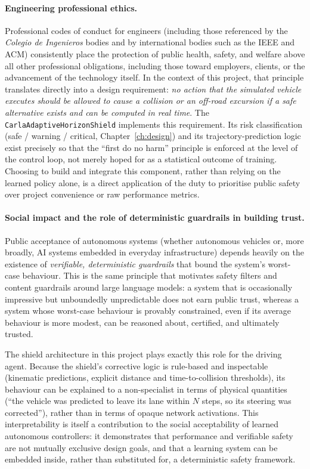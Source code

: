 \paragraph{Engineering professional ethics.}
Professional codes of conduct for engineers (including those referenced by the
\textit{Colegio de Ingenieros} bodies and by international bodies such as the IEEE and
ACM) consistently place the protection of public health, safety, and welfare above
all other professional obligations, including those toward employers, clients, or the
advancement of the technology itself. In the context of this project, that principle
translates directly into a design requirement: \textit{no action that the simulated
vehicle executes should be allowed to cause a collision or an off-road excursion if a
safe alternative exists and can be computed in real time}. The
\texttt{CarlaAdaptiveHorizonShield} implements this requirement. Its risk
classification (safe / warning / critical, Chapter~\ref{ch:design}) and its
trajectory-prediction logic exist precisely so that the ``first do no harm'' principle is
enforced at the level of the control loop, not merely hoped for as a statistical outcome
of training. Choosing to build and integrate this component, rather than relying on the
learned policy alone, is a direct application of the duty to prioritise public safety
over project convenience or raw performance metrics.

\paragraph{Social impact and the role of deterministic guardrails in building trust.}
Public acceptance of autonomous systems (whether autonomous vehicles or, more broadly,
AI systems embedded in everyday infrastructure) depends heavily on the existence of
\textit{verifiable, deterministic guardrails} that bound the system's worst-case
behaviour. This is the same principle that motivates safety filters and content
guardrails around large language models: a system that is occasionally impressive but
unboundedly unpredictable does not earn public trust, whereas a system whose
worst-case behaviour is provably constrained, even if its average behaviour is more
modest, can be reasoned about, certified, and ultimately trusted.

The shield architecture in this project plays exactly this role for the driving agent.
Because the shield's corrective logic is rule-based and inspectable (kinematic
predictions, explicit distance and time-to-collision thresholds), its behaviour can be
explained to a non-specialist in terms of physical quantities (``the vehicle was
predicted to leave its lane within \(N\) steps, so its steering was corrected''), rather
than in terms of opaque network activations. This interpretability is itself a
contribution to the social acceptability of learned autonomous controllers: it
demonstrates that performance and verifiable safety are not mutually exclusive design
goals, and that a learning system can be embedded inside, rather than substituted for,
a deterministic safety framework.

